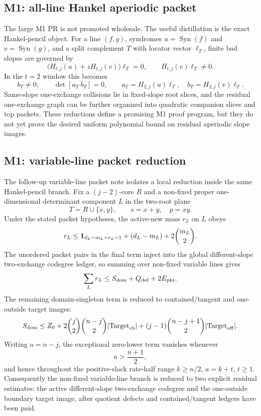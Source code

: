 \documentclass[11pt]{article}
\begin{document}
\subsection{M1: all-line Hankel aperiodic packet}

The large M1 PR is not promoted wholesale.  The useful distillation is the exact
Hankel-pencil object.  For a line \((f,g)\), syndromes \(u=\operatorname{Syn}(f)\)
and \(v=\operatorname{Syn}(g)\), and a split complement \(T\) with locator vector
\(\ell_T\), finite bad slopes are governed by
\[
  \bigl(H_{t,j}(u)+zH_{t,j}(v)\bigr)\ell_T=0,
  \qquad
  H_{t,j}(v)\ell_T\ne0.
\]
In the \(t=2\) window this becomes
\[
  b_T\ne0,\qquad \det[a_T\ b_T]=0,
  \qquad
  a_T=H_{2,j}(u)\ell_T,\quad b_T=H_{2,j}(v)\ell_T.
\]
Same-slope one-exchange collisions lie in fixed-slope root slices, and the
residual one-exchange graph can be further organized into quadratic companion
slices and top packets.  These reductions define a promising M1 proof program,
but they do not yet prove the desired uniform polynomial bound on residual
aperiodic slope images.

\subsection{M1: variable-line packet reduction}

The follow-up variable-line packet note isolates a local reduction inside the
same Hankel-pencil branch.  Fix a \((j-2)\)-core \(R\) and a non-fixed proper
one-dimensional determinant component \(L\) in the two-root plane
\[
  T=R\cup\{x,y\},\qquad s=x+y,\quad p=xy .
\]
Under the stated packet hypotheses, the active-new mass \(r_L\) on \(L\) obeys
\[
  r_L
  \le
  {\bf 1}_{d_L=m_L=r_L=1}
  +(d_L-m_L)+2\binom{m_L}{2}.
\]
The unordered packet pairs in the final term inject into the global
different-slope two-exchange codegree ledger, so summing over non-fixed
variable lines gives
\[
  \sum_L r_L
  \le S_{\rm dom}+Q_{\rm def}+2E_{\rm pkt}.
\]
The remaining domain-singleton term is reduced to contained/tangent and
one-outside target images:
\[
  S_{\rm dom}
  \le
  Z_0
  +2\binom{j}{2}\binom{n-j}{2}|{\rm Target}_{\rm cb}|
  +(j-1)\binom{n-j+1}{2}|{\rm Target}_{\rm off}|.
\]
Writing \(a=n-j\), the exceptional zero-lower term vanishes whenever
\[
  a>\frac{n+1}{2},
\]
and hence throughout the positive-slack rate-half range \(k\ge n/2\),
\(a=k+t\), \(t\ge1\).  Consequently the non-fixed variable-line branch is
reduced to two explicit residual estimates: the active different-slope
two-exchange codegree and the one-outside boundary target image, after quotient
defects and contained/tangent ledgers have been paid.
\end{document}
